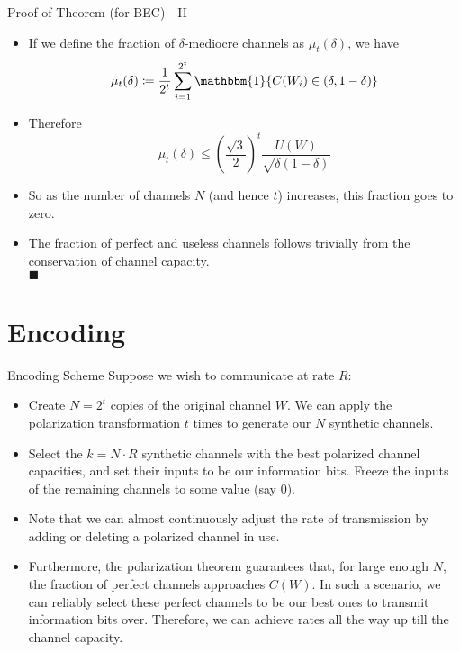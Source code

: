 \documentclass[8pt, compress]{beamer}
\begin{document}
\begin{frame}{Proof of Theorem (for BEC) - II}
    \begin{itemize}
        \item<1-> If we define the fraction of $\delta$-mediocre channels as $\mu_t (\delta)$, we have
        $$
        \mu_t (\delta) \coloneqq \frac{1}{2^t}\sum_{i = 1}^{2^t}{\mathbbm{1}\{C(W_i) \in (\delta, 1-\delta)\}}
        $$
        \item<2-> Therefore
        $$
        \mu_t (\delta) \leq \left(\frac{\sqrt{3}}{2}\right)^{t} \frac{U(W)}{\sqrt{\delta(1-\delta)}}
        $$
        \item<3-> So as the number of channels $N$ (and hence $t$) increases, this fraction goes to zero. 
        \item<4-> The fraction of perfect and useless channels follows trivially from the conservation of channel capacity.\\
        \hfill $\blacksquare$
    \end{itemize}
\end{frame}

\section{Encoding}

\begin{frame}{Encoding Scheme}
Suppose we wish to communicate at rate $R$:

\begin{itemize}
    \item<2-> Create $N = 2^t$ copies of the original channel $W$. We can apply the polarization transformation $t$ times to generate our $N$ synthetic channels.
    \item<3-> Select the $k = N\cdot R$ synthetic channels with the best polarized channel capacities, and set their inputs to be our information bits. Freeze the inputs of the remaining channels to some value (say 0). 
    \item<4-> Note that we can almost continuously adjust the rate of transmission by adding or deleting a polarized channel in use.
    \item<5-> Furthermore, the polarization theorem guarantees that, for large enough $N$, the fraction of perfect channels approaches $C(W)$. In such a scenario, we can reliably select these perfect channels to be our best ones to transmit information bits over. Therefore, we can achieve rates all the way up till the channel capacity.
\end{itemize}

    
\end{frame}
\end{document}
